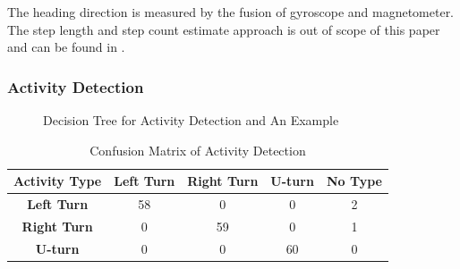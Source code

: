 \documentclass[conference]{IEEEtran}
\begin{document}
The heading direction is measured by the fusion of gyroscope and magnetometer. The step length and step count estimate approach is out of scope of this paper and can be found in \cite{wang2012no}.

\subsubsection{Activity Detection}

\begin{figure}[!ht]
	\centering
	\vfil
	\caption{Decision Tree for Activity Detection and An Example}
\end{figure}

\begin{table}
	\label{tab_conf}
	\caption{Confusion Matrix of Activity Detection}
	\begin{center}
		\begin{tabular}{| c | c | c | c | c |}
			\hline
			\bfseries Activity Type & \bfseries Left Turn & \bfseries Right Turn & \bfseries U-turn & \bfseries No Type\\
			\hline
			\bfseries Left Turn & 58 & 0 & 0 & 2 \\
			\hline
			\bfseries Right Turn & 0 & 59 & 0 & 1 \\
			\hline
			\bfseries U-turn & 0 & 0 & 60 & 0 \\
			\hline
		\end{tabular}
	\end{center}
\end{table}
\end{document}
